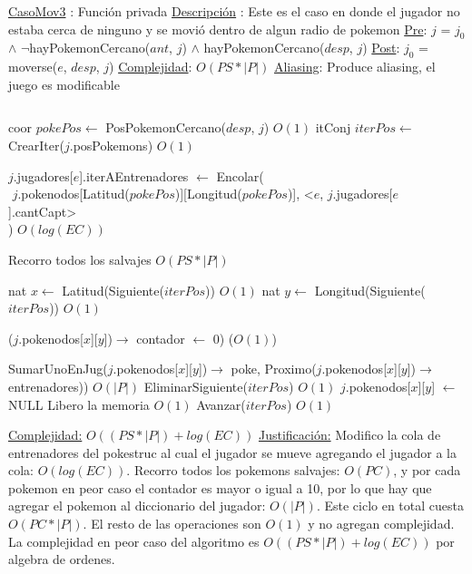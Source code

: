 \begin{Algoritmos}
\begin{algorithmic}[1]
\Statex \underline{CasoMov3} : Funci\'on privada 
\Statex \underline{Descripci\'on} : Este es el caso en donde el jugador no estaba cerca de ninguno y se movi\'o dentro de algun radio de pokemon
\Statex \underline{Pre}: $j$ = $j_0$ $\land$ $\neg$hayPokemonCercano($ant$, $j$) $\land$ hayPokemonCercano($desp$, $j$) 
\Statex \underline{Post}: $j_0$ = moverse($e$, $desp$, $j$) 
\Statex \underline{Complejidad}: $O(PS *|P|)$ 
\Statex \underline{Aliasing}: Produce aliasing, el juego es modificable

$ $\newline

\State coor $pokePos \gets$ PosPokemonCercano($desp$, $j$) \Comment $O(1)$
\State itConj $iterPos \gets$ CrearIter($j$.posPokemons) \Comment $O(1)$ 

\State $j$.jugadores[$e$].iterAEntrenadores $\gets$ Encolar(\\
$   $\hspace*{2cm}  $j$.pokenodos[Latitud($pokePos$)][Longitud($pokePos$)], <$e$, $j$.jugadores[$e$].cantCapt>\\
$   $\hspace*{1cm}) \Comment $O(log(EC))$

 Recorro todos los salvajes \Comment $O(PS * |P|)$

  \State nat $x \gets$ Latitud(Siguiente($iterPos$)) \Comment $O(1)$
  \State nat $y \gets$ Longitud(Siguiente($iterPos$)) \Comment $O(1)$   
  
    \State ($j$.pokenodos[$x$][$y$])$\rightarrow$ contador $\gets$ 0) \Comment($O(1)$)
  \EndIf
  
    \State SumarUnoEnJug($j$.pokenodos[$x$][$y$])$\rightarrow$ poke, Proximo($j$.pokenodos[$x$][$y$])$\rightarrow$ entrenadores)) \Comment $O(|P|)$
    \State EliminarSiguiente($iterPos$) \Comment $O(1)$
    \State $j$.pokenodos[$x$][$y$] $\gets$ NULL \Comment Libero la memoria $O(1)$
  \Else 
    \State Avanzar($iterPos$) \Comment $O(1)$ 
  \EndIf

\EndWhile 

\medskip
\Statex \underline{Complejidad:} $O((PS *|P|) + log(EC))$ 
\Statex \underline{Justificaci\'on:} Modifico la cola de entrenadores del pokestruc al cual el jugador se mueve agregando el jugador a la cola: $O(log(EC))$. Recorro todos los pokemons salvajes: $O(PC)$, y por cada pokemon en peor caso el contador es mayor o igual a 10, por lo que hay que agregar el pokemon al diccionario del jugador: $O(|P|)$. Este ciclo en total cuesta $O(PC*|P|)$. El resto de las operaciones son $O(1)$ y no agregan complejidad. La complejidad en peor caso del algoritmo es $O((PS *|P|) + log(EC))$ por algebra de ordenes.
\end{algorithmic}


\end{Algoritmos}

